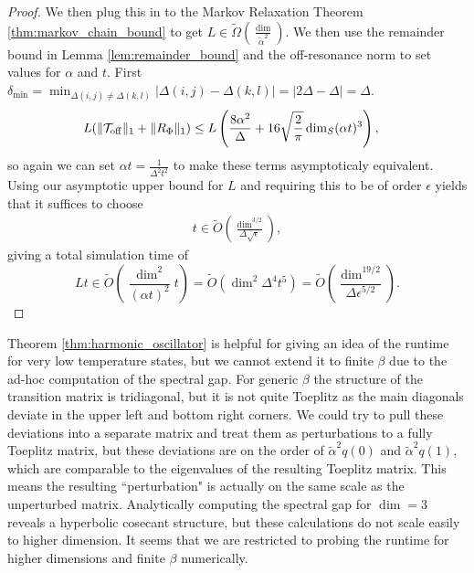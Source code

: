 \documentclass{article}
\newcommand{\off}{\rm off}
\newcommand{\parens}[1]{\left( #1 \right)}
\newcommand{\norm}[1]{\| #1 \|}
\newcommand{\bigotilde}[1]{\widetilde{O} \left( #1 \right)}
\begin{document}
\begin{proof}
We then plug this in to the Markov Relaxation Theorem \ref{thm:markov_chain_bound} to get $L \in \widetilde{\Omega}\left( \frac{\dim}{\widetilde{\alpha}^2}\right)$. We then use the remainder bound in Lemma \ref{lem:remainder_bound} and the off-resonance norm to set values for $\alpha$ and $t$. First $\delta_{\min} = \min_{\Delta(i,j) \neq \Delta(k,l)} |\Delta(i,j) - \Delta(k,l)| = |2 \Delta - \Delta| = \Delta$.
\begin{align}
  L(\norm{\mathcal{T}_{\off}}_1 + \norm{R_{\Phi}}_1) &\le L \left(\frac{8 \alpha^2}{\Delta} + 16 \sqrt{\frac{2}{\pi}} \dim_S (\alpha t)^3 \right),
\end{align}
so again we can set $\alpha t = \frac{1}{\Delta^2 t^2}$ to make these terms asymptoticaly equivalent. Using our asymptotic upper bound for $L$ and requiring this to be of order $\epsilon$ yields that it suffices to choose
\begin{align}
    t \in \widetilde{O} \left( \frac{\dim^{3/2}}{\Delta \sqrt{\epsilon}} \right),
\end{align}
giving a total simulation time of 
\begin{equation}
    L t \in \bigotilde{\frac{\dim^2}{(\alpha t)^2} t} = \bigotilde{ \dim^2 \Delta^4 t^5} = \widetilde{O} \parens{\frac{\dim^{19/2}}{\Delta \epsilon^{5/2}} }.
\end{equation}
\end{proof}

Theorem \ref{thm:harmonic_oscillator} is helpful for giving an idea of the runtime for very low temperature states, but we cannot extend it to finite $\beta$ due to the ad-hoc computation of the spectral gap. For generic $\beta$ the structure of the transition matrix is tridiagonal, but it is not quite Toeplitz as the main diagonals deviate in the upper left and bottom right corners. We could try to pull these deviations into a separate matrix and treat them as perturbations to a fully Toeplitz matrix, but these deviations are on the order of $\widetilde{\alpha}^2 q(0)$ and $\widetilde{\alpha}^2 q(1)$, which are comparable to the eigenvalues of the resulting Toeplitz matrix. This means the resulting ``perturbation" is actually on the same scale as the unperturbed matrix. Analytically computing the spectral gap for $\dim = 3$ reveals a hyperbolic cosecant structure, but these calculations do not scale easily to higher dimension. It seems that we are restricted to probing the runtime for higher dimensions and finite $\beta$ numerically.
\end{document}
